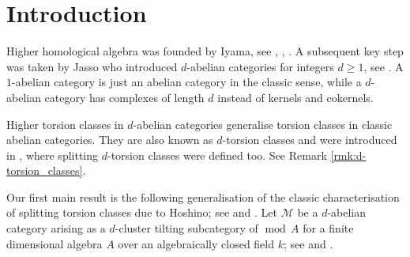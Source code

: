 \documentclass[12pt,reqno]{amsart}
\def\cM{\mathscr{M}}
\def\mod{\operatorname{mod}}
\numberwithin{equation}{section}
\theoremstyle{definition}
\theoremstyle{theorem}
\theoremstyle{definition}
\begin{document}
\maketitle




\setcounter{section}{-1}
\section{Introduction}
\label{sec:introduction}


Higher homological algebra was founded by Iyama, see \cite{Iyama_Auslander-correspondence}, \cite{Iyama_Cluster-tilting-for-higher-Auslander-algebras}, \cite{Iyama_Higher-dimensional-AR-theory}.  A subsequent key step was taken by Jasso who introduced $d$-abelian categories for integers $d \geqslant 1$, see  \cite[def.\ 3.1]{Jasso_n-abelian}.  A $1$-abelian category is just an abelian category in the classic sense, while a $d$-abelian category has complexes of length $d$ instead of kernels and cokernels.

Higher torsion classes in $d$-abelian categories generalise torsion classes in classic abelian categories.  They are also known as $d$-torsion classes and were introduced in \cite[def.\ 1.1]{Jorgensen_Torsion-classes-in-higher-homological-algebra}, where splitting $d$-torsion classes were defined too.  See Remark \ref{rmk:d-torsion_classes}.  

Our first main result is the following generalisation of the classic characterisation of splitting torsion classes due to Hoshino; see \cite[prop.\ 1]{Hoshino_On-splitting-torsion-theories-induced-by-tilting-modules} and \cite[prop.\ VI.1.7]{Assem-Simson-Skowronski_Elements-I}.  Let $\cM$ be a $d$-abelian category arising as a $d$-cluster tilting subcategory of $\mod\,A$ for a finite dimensional algebra $A$ over an algebraically closed field $k$; see \cite[def.\ 2.2]{Iyama_Higher-dimensional-AR-theory} and \cite[def.\ 3.14]{Jasso_n-abelian}.  
\end{document}
